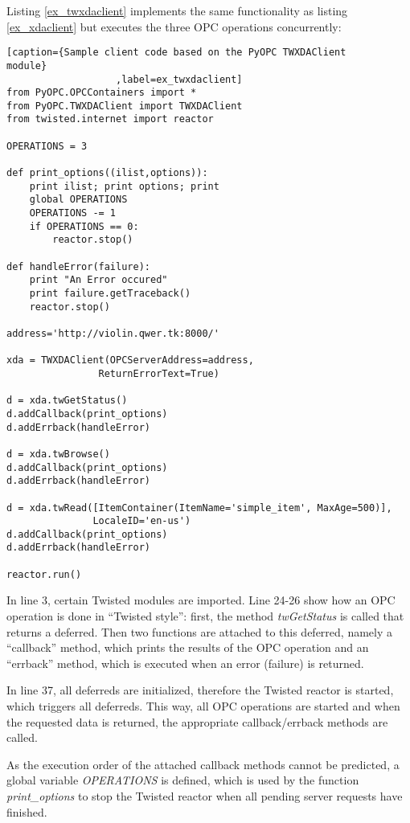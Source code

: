 Listing \ref{ex_twxdaclient} implements the same functionality as 
listing \ref{ex_xdaclient} but executes the three OPC operations 
concurrently:

\lstset{language=C}
\begin{lstlisting}[caption={Sample client code based on the PyOPC TWXDAClient 
module}
                   ,label=ex_twxdaclient] 
from PyOPC.OPCContainers import *
from PyOPC.TWXDAClient import TWXDAClient
from twisted.internet import reactor

OPERATIONS = 3

def print_options((ilist,options)):
    print ilist; print options; print
    global OPERATIONS
    OPERATIONS -= 1
    if OPERATIONS == 0:
        reactor.stop()

def handleError(failure):
    print "An Error occured"
    print failure.getTraceback()
    reactor.stop()
    
address='http://violin.qwer.tk:8000/'

xda = TWXDAClient(OPCServerAddress=address,
                ReturnErrorText=True)

d = xda.twGetStatus()
d.addCallback(print_options)
d.addErrback(handleError)

d = xda.twBrowse()
d.addCallback(print_options)
d.addErrback(handleError)

d = xda.twRead([ItemContainer(ItemName='simple_item', MaxAge=500)],
               LocaleID='en-us')
d.addCallback(print_options)
d.addErrback(handleError)

reactor.run()
\end{lstlisting}

In line 3, certain Twisted modules are imported. Line 24-26 show how
an OPC operation is done in ``Twisted style'': first, the method {\sl
twGetStatus} is called that returns a deferred. Then two functions are
attached to this deferred, namely a ``callback'' method, which prints
the results of the OPC operation and an ``errback'' method, which is
executed when an error (failure) is returned.

In line 37, all deferreds are initialized, therefore the Twisted
reactor is started, which triggers all deferreds. This way, all OPC
operations are started and when the requested data is returned, the
appropriate callback/errback methods are called.

As the execution order of the attached callback methods cannot be
predicted, a global variable {\sl OPERATIONS} is defined, which is
used by the function {\sl print\_options} to stop the Twisted reactor
when all pending server requests have finished.

